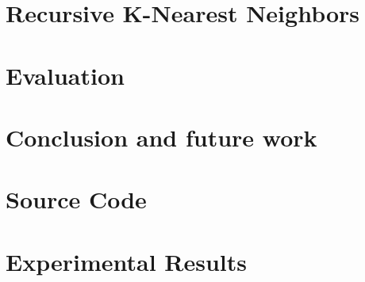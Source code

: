 \documentclass[11pt]{report}
\begin{document}
\chapter{Recursive K-Nearest Neighbors}
\label{chap:3}


\chapter{Evaluation}
\label{chap:4}


\chapter{Conclusion and future work}
\label{chap:5}




\appendix
\chapter{Source Code}
\label{chap:appendix_src}


\chapter{Experimental Results}
\label{chap:appendix_results}

\end{document}
